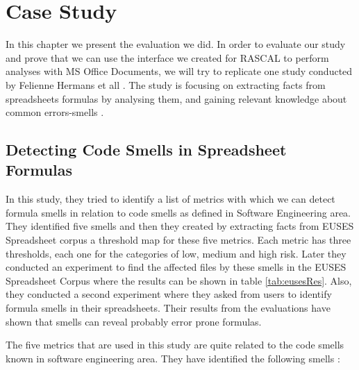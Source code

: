 
\chapter{Case Study} %

\label{Chapter5} %


In this chapter we present the evaluation we did. In order to evaluate our study and prove that we can use the interface we created for RASCAL to perform analyses with MS Office Documents, we will try to replicate one study conducted by Felienne Hermans et all \cite{feliene1}. The study is focusing on extracting facts from spreadsheets formulas by analysing them, and gaining relevant knowledge about common errors-smells .

\section{Detecting Code Smells in Spreadsheet Formulas}
In this study, they tried to identify a list of metrics with which we can detect formula smells in relation to code smells as defined in Software Engineering area. They identified five smells and then they created by extracting facts from EUSES Spreadsheet corpus\cite{eusesCorpus} a threshold map for these five metrics. Each metric has three thresholds, each one for the categories of low, medium and high risk. Later they conducted an experiment to find the affected files by these smells in the EUSES Spreadsheet Corpus where the results can be shown in table \ref{tab:eusesRes}. Also, they conducted a second experiment where they asked from users to identify formula smells in their spreadsheets. Their results from the evaluations have shown that smells can reveal probably error prone formulas.

The five metrics that are used in this study are quite related to the code smells known in software engineering area. They have identified the following smells :

